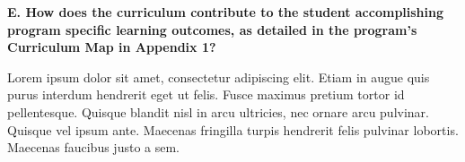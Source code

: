 \textbf{E. How does the curriculum contribute to the student accomplishing program specific learning outcomes, as detailed in the program’s Curriculum Map in Appendix 1? }

Lorem ipsum dolor sit amet, consectetur adipiscing elit. Etiam in augue quis purus interdum hendrerit eget ut felis. Fusce maximus pretium tortor id pellentesque. Quisque blandit nisl in arcu ultricies, nec ornare arcu pulvinar. Quisque vel ipsum ante. Maecenas fringilla turpis hendrerit felis pulvinar lobortis. Maecenas faucibus justo a sem. 
